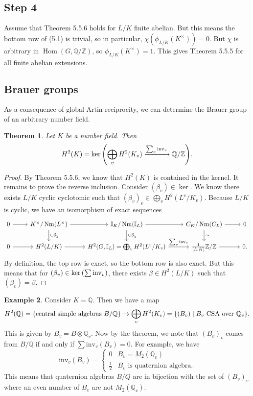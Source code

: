 \documentclass[leqno, openany]{memoir}
\newtheorem{thm}{Theorem}[section]
\theoremstyle{definition}
\newtheorem{exm}[thm]{Example}
\theoremstyle{remark}
\theoremstyle{plain}
\theoremstyle{definition}
\theoremstyle{remark}
\newcommand{\Z}{\mathbb{Z}}
\newcommand{\Q}{\mathbb{Q}}
\newcommand{\I}{\mathbb{I}}
\newcommand{\mr}[1]{\mathrm{#1}}
\DeclareMathOperator{\Hom}{Hom}
\DeclareMathOperator{\Nm}{Nm}
\begin{document}
\subsection{Step 4}%

Assume that Theorem 5.5.6 holds for $L/K$ finite abelian. But this means the
bottom row of (5.1) is trivial, so in particular, $\chi(\phi_{L/K}(K^{\times}))
= 0$. But $\chi$ is arbitrary in $\Hom(G, \Q/\Z)$, so $\phi_{L/K}(K^{\times}) =
1$. This gives Theorem 5.5.5 for all finite abelian extensions.

\subsection{Brauer groups}%

As a consequence of global Artin reciprocity, we can determine the Brauer group
of an arbitrary number field.

\begin{thm} Let $K$ be a number field. Then \[ H^2(K) = \ker \qty(\bigoplus_v
H^2(K_v) \xrightarrow{\sum_v \mr{inv}_v} \Q/\Z). \] \end{thm}

\begin{proof} By Theorem 5.5.6, we know that $H^2(K)$ is contained in the
    kernel. It remains to prove the reverse inclusion. Consider $(\beta_v) \in
    \ker$. We know there exists $L/K$ cyclic cyclotomic such that
    ${(\beta_v)}_v \in \bigoplus_v H^2(L^v/K_v)$. Because $L/K$ is cyclic, we
    have an isomorphism of exact sequences \begin{equation*} \begin{tikzcd} 0
        \ar{r} & K^{\times}/\Nm(L^{\times}) \ar{r} \ar{d}{\cup \delta_{\chi}} &
        \I_K/\Nm(\I_L) \ar{r} \ar{d}{\cup \delta_{\chi}} & C_K/\Nm(C_L)
        \ar{d}{\sim} \ar{r} & 0 \\ 0 \ar{r} & H^2(L/K) \ar{r} & H^2(G, \I_L) =
    \bigoplus_v H^2(L^v/K_v) \ar{r}{\sum_v \mr{inv}_v} & \frac{1}{[L:K]} \Z/\Z
\ar{r} & 0.  \end{tikzcd} \end{equation*} By definition, the top row is exact,
so the bottom row is also exact. But this means that for $(\beta_v) \in
\ker\qty(\sum \mr{inv}_v)$, there exists $\beta \in H^2(L/K)$ such that
$(\beta_v) = \beta$.  \end{proof}

\begin{exm} Consider $K = \Q$. Then we have a map \[ H^2(\Q) =
\qty{\text{central simple algebras }B/\Q} \to \bigoplus_v H^2(K_v) = \qty{(B_v)
\mid B_v\text{ CSA over } \Q_v}. \] This is given by $B_v = B \otimes \Q_v$.
Now by the theorem, we note that ${(B_v)}_v$ comes from $B/\Q$ if and only if
$\sum \mr{inv}_v(B_v) = 0$. For example, we have \[ \mr{inv}_v(B_v) =
    \begin{cases} 0 & B_v = M_2(\Q_v) \\ \frac{1}{2} & B_v \text{ is quaternion
    algebra}.  \end{cases} \] This means that quaternion algebras $B/Q$ are in
    bijection with the set of ${(B_v)}_v$ where an even number of $B_v$ are not
    $M_2(\Q_v)$.  \end{exm}
\end{document}
